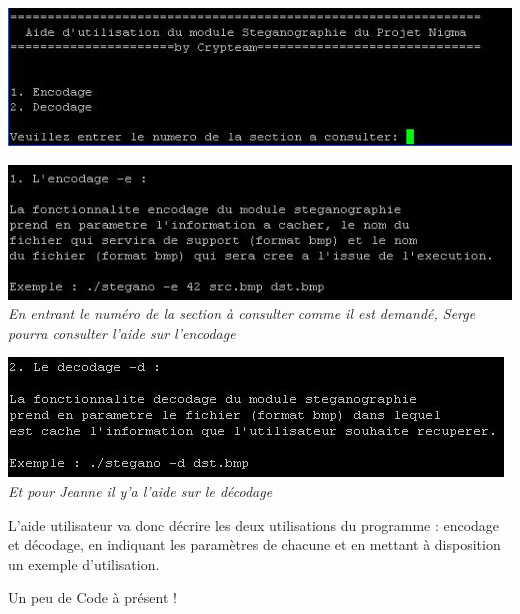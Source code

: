 \documentclass[a4paper,12pt]{article}
\begin{document}
	\begin{center}	
		\includegraphics[scale=1]{aide1.JPG}
	\end{center}

	\begin{center}	
		\includegraphics[scale=1]{aide3.JPG}
		\textit{En entrant le numéro de la section à consulter comme il est demandé, Serge pourra consulter l’aide sur l’encodage}
	\end{center}


	\begin{center}	
		\includegraphics[scale=1]{aide2.JPG}
		\textit{\\Et pour Jeanne il y’a l’aide sur le décodage}
	\end{center}

L’aide utilisateur va donc décrire les deux utilisations du programme : encodage et décodage, en indiquant les paramètres de chacune et en mettant à disposition un exemple d’utilisation.
  
Un peu de Code à présent !  
\end{document}
